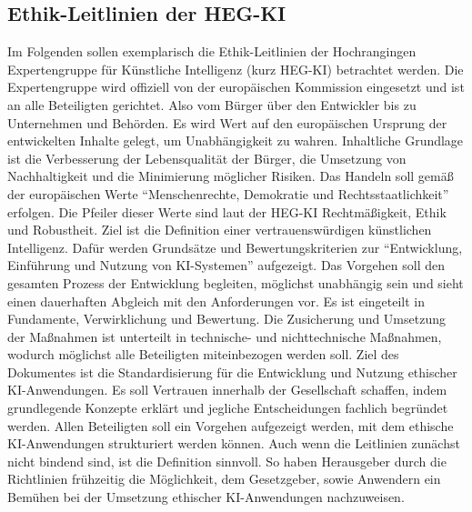 \subsection*{Ethik-Leitlinien der HEG-KI}
Im Folgenden sollen exemplarisch die Ethik-Leitlinien der Hochrangingen Expertengruppe für Künstliche Intelligenz (kurz HEG-KI) betrachtet werden.
Die Expertengruppe wird offiziell von der europäischen Kommission eingesetzt und ist an alle Beteiligten gerichtet.
Also vom Bürger über den Entwickler bis zu Unternehmen und Behörden.
Es wird Wert auf den europäischen Ursprung der entwickelten Inhalte gelegt, um Unabhängigkeit zu wahren.
Inhaltliche Grundlage ist die Verbesserung der Lebensqualität der Bürger, die Umsetzung von Nachhaltigkeit und die Minimierung möglicher Risiken.
Das Handeln soll gemäß der europäischen Werte \enquote{Menschenrechte, Demokratie und Rechtsstaatlichkeit} \cite[S. 6]{smuha} erfolgen.
Die Pfeiler dieser Werte sind laut der HEG-KI Rechtmäßigkeit, Ethik und Robustheit.
Ziel ist die Definition einer vertrauenswürdigen künstlichen Intelligenz.
Dafür werden Grundsätze und Bewertungskriterien zur \enquote{Entwicklung, Einführung und Nutzung von KI-Systemen} \cite[S. 3]{smuha} aufgezeigt.
Das Vorgehen soll den gesamten Prozess der Entwicklung begleiten, möglichst unabhängig sein und sieht einen dauerhaften Abgleich mit den Anforderungen vor.
Es ist eingeteilt in Fundamente, Verwirklichung und Bewertung.
Die Zusicherung und Umsetzung der Maßnahmen ist unterteilt in technische- und nichttechnische Maßnahmen, wodurch möglichst alle Beteiligten miteinbezogen werden soll.
\ab 
Ziel des Dokumentes ist die Standardisierung für die Entwicklung und Nutzung ethischer KI-Anwendungen.
Es soll Vertrauen innerhalb der Gesellschaft schaffen, indem grundlegende Konzepte erklärt und jegliche Entscheidungen fachlich begründet werden.
Allen Beteiligten soll ein Vorgehen aufgezeigt werden, mit dem ethische KI-Anwendungen strukturiert werden können.
Auch wenn die Leitlinien zunächst nicht bindend sind, ist die Definition sinnvoll.
So haben Herausgeber durch die Richtlinien frühzeitig die Möglichkeit, dem Gesetzgeber, sowie Anwendern ein Bemühen bei der Umsetzung ethischer KI-Anwendungen nachzuweisen.